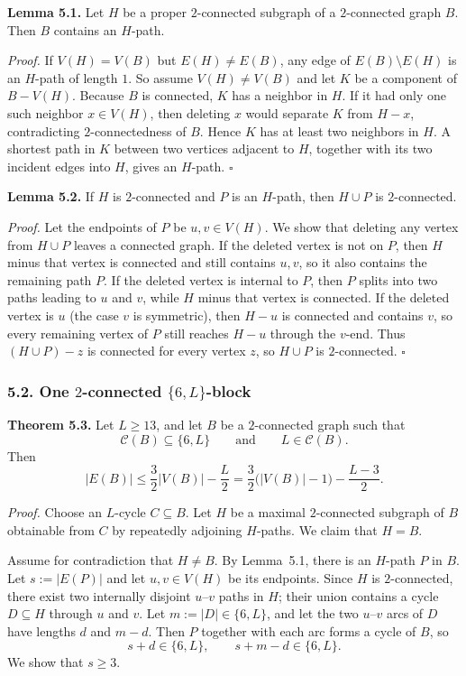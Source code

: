 \medskip
\textbf{Lemma 5.1.}
Let $H$ be a proper $2$-connected subgraph of a $2$-connected graph $B$. Then $B$ contains an $H$-path.

\medskip
\textit{Proof.}
If $V(H)=V(B)$ but $E(H)\neq E(B)$, any edge of $E(B)\setminus E(H)$ is an $H$-path of length $1$.
So assume $V(H)\neq V(B)$ and let $K$ be a component of $B-V(H)$.
Because $B$ is connected, $K$ has a neighbor in $H$.
If it had only one such neighbor $x\in V(H)$, then deleting $x$ would separate $K$ from $H-x$, contradicting $2$-connectedness of $B$.
Hence $K$ has at least two neighbors in $H$.
A shortest path in $K$ between two vertices adjacent to $H$, together with its two incident edges into $H$, gives an $H$-path.
\hfill$\square$

\medskip
\textbf{Lemma 5.2.}
If $H$ is $2$-connected and $P$ is an $H$-path, then $H\cup P$ is $2$-connected.

\medskip
\textit{Proof.}
Let the endpoints of $P$ be $u,v\in V(H)$.
We show that deleting any vertex from $H\cup P$ leaves a connected graph.
If the deleted vertex is not on $P$, then $H$ minus that vertex is connected and still contains $u,v$, so it also contains the remaining path $P$.
If the deleted vertex is internal to $P$, then $P$ splits into two paths leading to $u$ and $v$, while $H$ minus that vertex is connected.
If the deleted vertex is $u$ (the case $v$ is symmetric), then $H-u$ is connected and contains $v$, so every remaining vertex of $P$ still reaches $H-u$ through the $v$-end.
Thus $(H\cup P)-z$ is connected for every vertex $z$, so $H\cup P$ is $2$-connected.
\hfill$\square$

\subsubsection*{5.2. One $2$-connected $\{6,L\}$-block}

\textbf{Theorem 5.3.}
Let $L\ge 13$, and let $B$ be a $2$-connected graph such that
\[
\mathcal C(B)\subseteq\{6,L\}
\qquad\text{and}\qquad
L\in\mathcal C(B).
\]
Then
\[
|E(B)|\le \frac32|V(B)|-\frac L2
= \frac32\bigl(|V(B)|-1\bigr)-\frac{L-3}{2}.
\]

\medskip
\textit{Proof.}
Choose an $L$-cycle $C\subseteq B$.
Let $H$ be a maximal $2$-connected subgraph of $B$ obtainable from $C$ by repeatedly adjoining $H$-paths.
We claim that $H=B$.

Assume for contradiction that $H\neq B$.
By Lemma~5.1, there is an $H$-path $P$ in $B$.
Let $s:=|E(P)|$ and let $u,v\in V(H)$ be its endpoints.
Since $H$ is $2$-connected, there exist two internally disjoint $u$--$v$ paths in $H$; their union contains a cycle $D\subseteq H$ through $u$ and $v$.
Let $m:=|D|\in\{6,L\}$, and let the two $u$--$v$ arcs of $D$ have lengths $d$ and $m-d$.
Then $P$ together with each arc forms a cycle of $B$, so
\[
s+d\in\{6,L\},
\qquad
s+m-d\in\{6,L\}.
\]
We show that $s\ge 3$.

